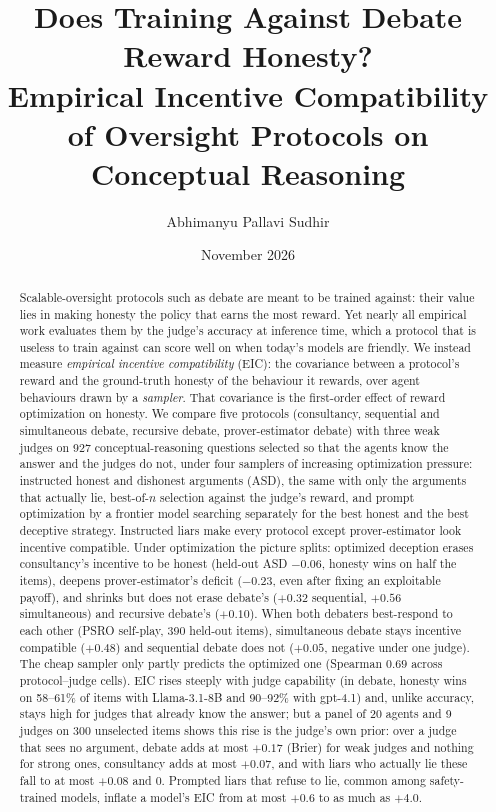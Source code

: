 \documentclass[11pt]{article}
\title{Does Training Against Debate Reward Honesty?\\ Empirical Incentive Compatibility of Oversight Protocols
on Conceptual Reasoning}
\author{Abhimanyu Pallavi Sudhir}
\date{November 2026}
\begin{document}
\maketitle

\begin{abstract}
Scalable-oversight protocols such as debate are meant to be trained against: their value lies in making honesty
the policy that earns the most reward. Yet nearly all empirical work evaluates them by the judge's accuracy at
inference time, which a protocol that is useless to train against can score well on when today's models are
friendly. We instead measure \emph{empirical incentive compatibility} (EIC): the covariance between a protocol's
reward and the ground-truth honesty of the behaviour it rewards, over agent behaviours drawn by a \emph{sampler}.
That covariance is the first-order effect of reward optimization on honesty. We compare five protocols
(consultancy, sequential and simultaneous debate, recursive debate, prover-estimator debate) with three weak judges
on 927 conceptual-reasoning questions selected so that the agents know the answer and the judges do not, under
four samplers of increasing optimization pressure: instructed honest and dishonest arguments (ASD), the same with
only the arguments that actually lie, best-of-$n$ selection against the judge's reward, and prompt optimization by
a frontier model searching separately for the best honest and the best deceptive strategy. Instructed liars make
every protocol except prover-estimator look incentive compatible. Under optimization the picture splits: optimized
deception erases consultancy's incentive to be honest (held-out ASD $-0.06$, honesty wins on half the items),
deepens prover-estimator's deficit ($-0.23$, even after fixing an exploitable payoff), and shrinks but does not
erase debate's ($+0.32$ sequential, $+0.56$ simultaneous) and recursive debate's ($+0.10$). When both debaters
best-respond to each other (PSRO self-play, 390 held-out items), simultaneous debate stays incentive compatible
($+0.48$) and sequential debate does not ($+0.05$, negative under one judge). The cheap sampler only
partly predicts the optimized one (Spearman $0.69$ across protocol--judge cells). EIC rises steeply with judge capability (in debate, honesty
wins on 58--61\% of items with Llama-3.1-8B and 90--92\% with gpt-4.1) and, unlike accuracy, stays high for
judges that already know the answer; but a panel of 20 agents and 9 judges on 300 unselected items shows this rise is
the judge's own prior: over a judge that sees no argument, debate adds at most $+0.17$ (Brier) for weak judges and nothing for strong ones, consultancy adds at most $+0.07$, and with liars who actually lie these fall to at most $+0.08$ and $0$. Prompted liars that refuse to lie, common among safety-trained models,
inflate a model's EIC from at most $+0.6$ to as much as $+4.0$.
\end{abstract}
\end{document}
